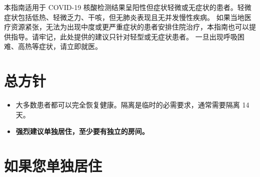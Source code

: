 \documentclass[onecolumn,journal]{IEEEtran}
\begin{document}
\begin{multicols}{2}

本指南适用于 COVID-19 核酸检测结果呈阳性但症状轻微或无症状的患者。轻微症状包括低热、轻微乏力、干咳，但无肺炎表现且无并发慢性疾病。
如果当地医疗资源紧张，无法为出现中度或更严重症状的患者安排住院治疗，本指南也可以提供指导。请牢记，此处提供的建议只针对轻型或无症状患者。
一旦出现呼吸困难、高热等症状，请立即就医。

\section*{总方针}

\begin{itemize}

  \item 大多数患者都可以完全恢复健康。隔离是临时的必需要求，通常需要隔离 14 天。
  \item \textbf{强烈建议单独居住，至少要有独立的房间。}

\end{itemize}


\section*{如果您单独居住}

\begin{itemize}


\end{itemize}
\end{multicols}
\end{document}
